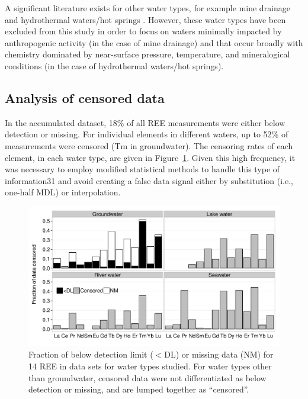 A significant literature exists for other water types, for example mine drainage \citep{Borrego_HR_2012, Bozau_AG_2004, Doulati_JEE_2013, Romero_AG_2010, Verplank_AG_2004, Worrall_GCA_2001, Zhao_IJCG_2007} and hydrothermal waters/hot springs \citep{Haas_GCA_1995, Lepel_conf_1988, Michard_GCA_1989, Lewis_GCA_1997, Lewis_GCA_1998, Sanada_Geotherm_2006}.
However, these water types have been excluded from this study in order to focus on waters minimally impacted by anthropogenic activity (in the case of mine drainage) and that occur broadly with chemistry dominated by near-surface pressure, temperature, and mineralogical conditions (in the case of hydrothermal waters/hot springs).

\subsection{Analysis of censored data}

In the accumulated dataset, 18\% of all REE measurements were either below detection or missing.
For individual elements in different waters, up to 52\% of measurements were censored (Tm in groundwater).
The censoring rates of each element, in each water type, are given in Figure~\ref{fig:cen_frac}.
Given this high frequency, it was necessary to employ modified statistical methods to handle this type of information31 and avoid creating a false data signal either by substitution (i.e., one-half MDL) or interpolation.

\begin{figure}[htbp]
\begin{center}
\includegraphics[width=\textwidth]{Ch3_figures/REE-waters-nonDet-type.pdf}
\caption{Fraction of below detection limit ($<$DL) or missing data (NM) for 14 REE in data sets for water types studied. For water types other than groundwater, censored data were not differentiated as below detection or missing, and are lumped together as ``censored''.}\label{fig:cen_frac}
\end{center}
\end{figure}


